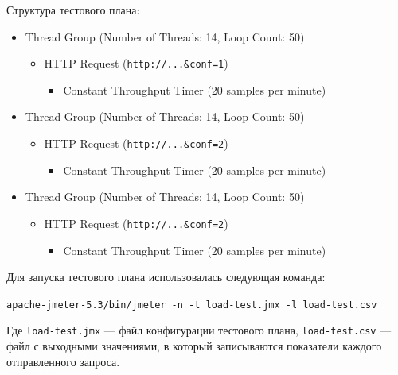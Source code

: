 \documentclass[listings]{labreport}
\begin{document}
Структура тестового плана:
\begin{itemize}[noitemsep,topsep=0em,label=$\bullet$]
  \item Thread Group (Number of Threads: 14, Loop Count: 50)
    \begin{itemize}[noitemsep,topsep=0em,label=$\bullet$]
      \item HTTP Request (\verb|http://...&conf=1|)
        \begin{itemize}[noitemsep,topsep=0em,label=$\bullet$]
          \item Constant Throughput Timer (20 samples per minute)
        \end{itemize}
    \end{itemize}
\end{itemize}
\begin{itemize}[noitemsep,topsep=0em,label=$\bullet$]
  \item Thread Group (Number of Threads: 14, Loop Count: 50)
    \begin{itemize}[noitemsep,topsep=0em,label=$\bullet$]
      \item HTTP Request (\verb|http://...&conf=2|)
        \begin{itemize}[noitemsep,topsep=0em,label=$\bullet$]
          \item Constant Throughput Timer (20 samples per minute)
        \end{itemize}
    \end{itemize}
\end{itemize}
\begin{itemize}[noitemsep,topsep=0em,label=$\bullet$]
  \item Thread Group (Number of Threads: 14, Loop Count: 50)
    \begin{itemize}[noitemsep,topsep=0em,label=$\bullet$]
      \item HTTP Request (\verb|http://...&conf=2|)
        \begin{itemize}[noitemsep,topsep=0em,label=$\bullet$]
          \item Constant Throughput Timer (20 samples per minute)
        \end{itemize}
    \end{itemize}
\end{itemize}

Для запуска тестового плана использовалась следующая команда:

\verb|apache-jmeter-5.3/bin/jmeter -n -t load-test.jmx -l load-test.csv|

Где \verb|load-test.jmx| — файл конфигурации тестового плана,
\verb|load-test.csv| — файл с выходными значениями, в который
записываются показатели каждого отправленного запроса.
\end{document}
